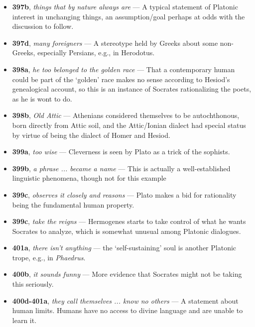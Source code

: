 \documentclass[12pt]{article}
\begin{document}
\begin{itemize}

\item \textbf{397b}, \textit{things that by nature always are} --- A typical statement of Platonic interest in unchanging things, an assumption/goal perhaps at odds with the discussion to follow.

\item \textbf{397d}, \textit{many foreigners} --- A stereotype held by Greeks about some non-Greeks, especially Persians, e.g., in Herodotus.

\item \textbf{398a}, \textit{he too belonged to the golden race} --- That a contemporary human could be part of the `golden' race makes no sense according to Hesiod's genealogical account, so this is an instance of Socrates rationalizing the poets, as he is wont to do.

\item \textbf{398b}, \textit{Old Attic} --- Athenians considered themselves to be autochthonous, born directly from Attic soil, and the Attic/Ionian dialect had special status by virtue of being the dialect of Homer and Hesiod.

\item \textbf{399a}, \textit{too wise} --- Cleverness is seen by Plato as a trick of the sophists.

\item \textbf{399b}, \textit{a phrase ... became a name} --- This is actually a well-established linguistic phenomena, though not for this example

\item \textbf{399c}, \textit{observes it closely and reasons} --- Plato makes a bid for rationality being the fundamental human property.

\item \textbf{399c}, \textit{take the reigns} --- Hermogenes starts to take control of what he wants Socrates to analyze, which is somewhat unusual among Platonic dialogues.

\item \textbf{401a}, \textit{there isn't anything} --- the `self-sustaining' soul is another Platonic trope, e.g., in \textit{Phaedrus}.

\item \textbf{400b}, \textit{it sounds funny} --- More evidence that Socrates might not be taking this seriously.

\item \textbf{400d-401a}, \textit{they call themselves ... know no others} --- A statement about human limits. Humans have no access to divine language and are unable to learn it.


\end{itemize}
\end{document}
